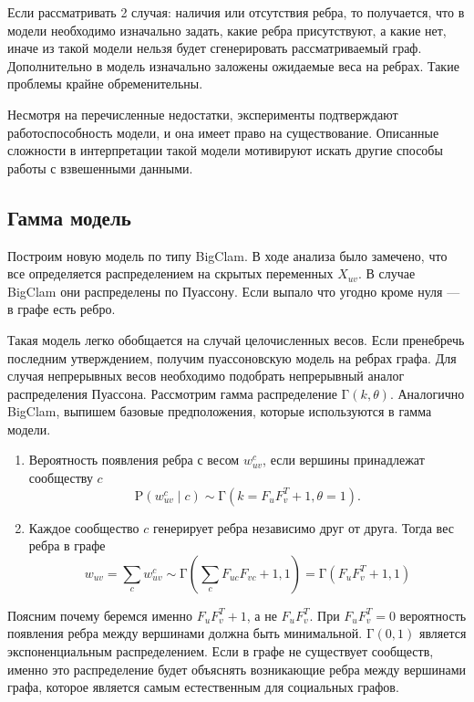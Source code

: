 \documentclass{ITaSconf}
\def\PP{\mathrm{P}}
\begin{document}
	Если рассматривать 2 случая: наличия или отсутствия ребра, то получается, что в модели необходимо изначально задать, какие ребра присутствуют, а какие нет, иначе из такой модели нельзя будет сгенерировать рассматриваемый граф. 
	Дополнительно в модель изначально заложены ожидаемые веса на ребрах. 
	Такие проблемы крайне обременительны.
	
	Несмотря на перечисленные недостатки, эксперименты подтверждают работоспособность модели, и она имеет право на существование.
	Описанные сложности в интерпретации такой модели мотивируют искать другие способы работы с взвешенными данными.
	
	\subsection{Гамма модель}
	
	Построим новую модель по типу BigClam. 
	В ходе анализа было замечено, что все определяется распределением на скрытых переменных $X_{uv}$. 
	В случае BigClam они распределены по Пуассону. 
	Если выпало что угодно кроме нуля --- в графе есть ребро. 
	
	Такая модель легко обобщается на случай целочисленных весов. 
	Если пренебречь последним утверждением, получим пуассоновскую модель на ребрах графа. 
	Для случая непрерывных весов необходимо подобрать непрерывный аналог распределения Пуассона.  
	Рассмотрим гамма распределение $\mathrm{\Gamma}(k, \theta)$.
	Аналогично BigClam, выпишем базовые предположения, которые используются в гамма модели.
	
	\begin{enumerate}
		\item Вероятность появления ребра с весом $w^{c}_{uv}$, если вершины принадлежат сообществу $c$
		$$\PP\left(w^{c}_{uv} \mid c\right) \sim \mathrm{\Gamma}\left(k=F_u F_v^T + 1, \theta=1\right).$$
		\item Каждое сообщество $c$ генерирует ребра независимо друг от друга. Тогда вес ребра в графе
		$$w_{uv} = \sum_{c} w_{uv}^c \sim \mathrm{\Gamma}\left(\sum_c F_{uc} F_{vc} + 1, 1\right) = \mathrm{\Gamma}\left(F_u F_v^T + 1, 1\right)$$
	\end{enumerate}
	
	Поясним почему беремся именно $F_u F_v^T + 1$, а не $F_u F_v^T$.
	При $F_u F_v^T=0$ вероятность появления ребра между вершинами должна быть минимальной. 
	$\mathrm{\Gamma}(0, 1)$ является экспоненциальным распределением. 
	Если в графе не существует сообществ, именно это распределение будет объяснять возникающие ребра между вершинами графа, которое является самым естественным для социальных графов.
	
\end{document}
